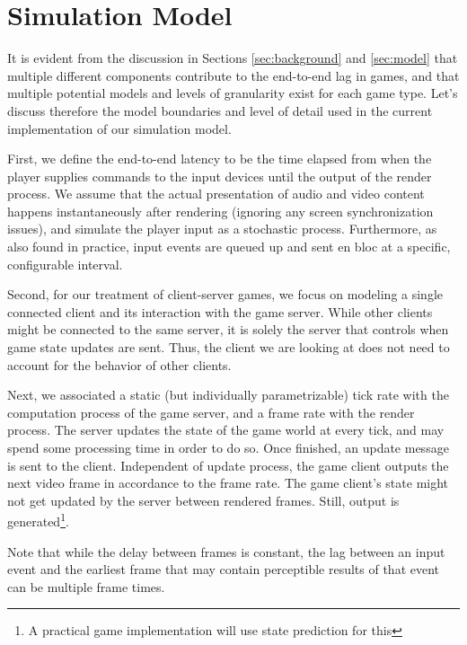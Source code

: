 \section{Simulation Model}
\label{sec:simulation}

It is evident from the discussion in Sections \ref{sec:background} 
and \ref{sec:model} that multiple different components contribute to 
the end-to-end lag in games, and that multiple potential models and 
levels of granularity exist for each game type.
Let's discuss therefore the model boundaries and level of detail 
used in the current implementation of our simulation model.

First, we define the end-to-end latency to be the time elapsed 
from when the player supplies commands to the input devices until the 
output of the render process. We assume that the actual presentation of 
audio and video content happens instantaneously after rendering 
(ignoring any screen synchronization issues), and simulate the player 
input as a stochastic process. %
Furthermore, as also found in practice, input events are queued up  
and sent en bloc at a specific, configurable interval.

Second, for our treatment of client-server games, we focus on modeling 
a single connected client and its interaction with the game server. 
While other clients might be connected to the same server, it is 
solely the server that controls when game state updates are sent. 
Thus, the client we are looking at does not need to account for the 
behavior of other clients.

Next, we associated a static (but individually parametrizable) tick 
rate with the computation process of the game server, and a frame rate 
with the render process. 
The server updates the state of the game world at every tick, and may 
spend some processing time in order to do so. Once finished, an update 
message is sent to the client.
Independent of update process, the game client outputs the next 
video frame in accordance to the frame rate. The game client's state 
might not get updated by the server between rendered frames. Still, 
output is generated\footnote{A practical game implementation will use state prediction for this}.

Note that while the delay between frames is constant, the lag between 
an input event and the earliest frame that may contain perceptible 
results of that event can be multiple frame times.

